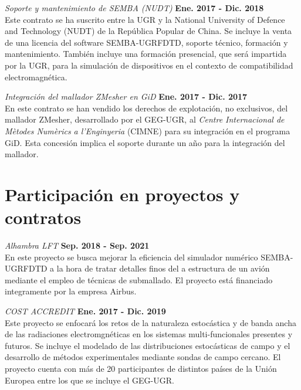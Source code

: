 \documentclass[a4paper,margin,line]{res}
\begin{document}
\begin{resume}
\begin{minipage}{\textwidth}
  {\em Soporte y mantenimiento de SEMBA (NUDT)} \hfill {\bf Ene. 2017 - Dic. 2018}\\
  Este contrato se ha suscrito entre la UGR y la National University of Defence and Technology (NUDT) de la República Popular de China. Se incluye la venta de una licencia del software SEMBA-UGRFDTD, soporte técnico, formación y mantenimiento. También incluye una formación presencial, que será impartida por la UGR, para la simulación de dispositivos en el contexto de compatibilidad electromagnética.
\end{minipage}

\begin{minipage}{\textwidth}
  {\em Integración del mallador ZMesher en GiD} \hfill {\bf Ene. 2017 - Dic. 2017}\\
  En este contrato se han vendido los derechos de explotación, no exclusivos, del mallador ZMesher, desarrollado por el GEG-UGR, al \textit{Centre Internacional de Mètodes Numèrics a l'Enginyeria} (CIMNE) para su integración en el programa GiD. Esta concesión implica el soporte durante un año para la integración del mallador.
\end{minipage}

\begin{minipage}{\textwidth}
	\section{\sc Participación en proyectos y contratos}
	{\em Alhambra LFT} \hfill {\bf Sep. 2018 - Sep. 2021}\\
	En este proyecto se busca mejorar la eficiencia del simulador numérico SEMBA-UGRFDTD a la hora de tratar detalles finos del a estructura de un avión mediante el empleo de técnicas de submallado. El proyecto está financiado integramente por la empresa Airbus.
\end{minipage}	

\begin{minipage}{\textwidth}
	{\em COST ACCREDIT} \hfill {\bf Ene. 2017 - Dic. 2019}\\
	Este proyecto se enfocará los retos de la naturaleza estocástica y de banda ancha de las radiaciones electromgnéticas en los sistemas multi-funcionales presentes y futuros. Se incluye el modelado de las distribuciones estocásticas de campo y el desarrollo de métodos experimentales mediante sondas de campo cercano. El proyecto cuenta con más de 20 participantes de distintos países de la Unión Europea entre los que se incluye el GEG-UGR.
\end{minipage}


\end{resume}
\end{document}
